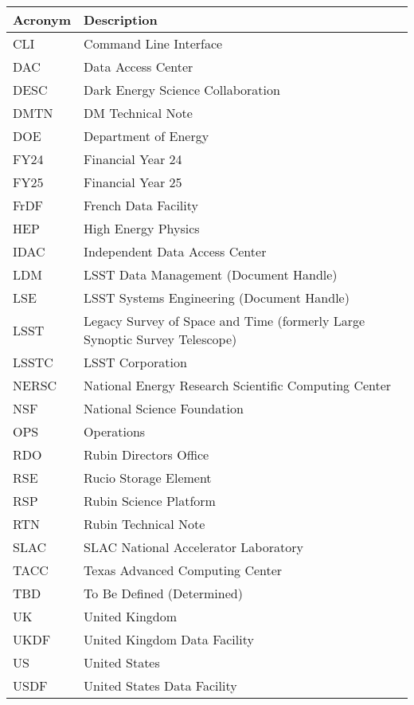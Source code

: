 \addtocounter{table}{-1}
\begin{longtable}{p{}p{}}\hline
\textbf{Acronym} & \textbf{Description}  \\\hline

CLI & Command Line Interface \\\hline
DAC & Data Access Center \\\hline
DESC & Dark Energy Science Collaboration \\\hline
DMTN & DM Technical Note \\\hline
DOE & Department of Energy \\\hline
FY24 & Financial Year 24 \\\hline
FY25 & Financial Year 25 \\\hline
FrDF & French Data Facility \\\hline
HEP &  High Energy Physics \\\hline
IDAC & Independent Data Access Center \\\hline
LDM & LSST Data Management (Document Handle) \\\hline
LSE & LSST Systems Engineering (Document Handle) \\\hline
LSST & Legacy Survey of Space and Time (formerly Large Synoptic Survey Telescope) \\\hline
LSSTC & LSST Corporation \\\hline
NERSC & National Energy Research Scientific Computing Center \\\hline
NSF & National Science Foundation \\\hline
OPS & Operations \\\hline
RDO & Rubin Directors Office \\\hline
RSE & Rucio Storage Element \\\hline
RSP & Rubin Science Platform \\\hline
RTN & Rubin Technical Note \\\hline
SLAC & SLAC National Accelerator Laboratory \\\hline
TACC & Texas Advanced Computing Center \\\hline
TBD & To Be Defined (Determined) \\\hline
UK & United Kingdom \\\hline
UKDF & United Kingdom Data Facility \\\hline
US & United States \\\hline
USDF & United States Data Facility \\\hline
\end{longtable}
